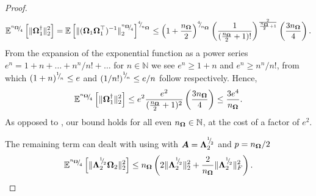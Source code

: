 \begin{proof}
    \begin{equation}
        \mathbb{E}^{\sfrac{n_{\mtx{\Omega}}}{4}}\left[ \lVert \mtx{\Omega}_1^{\dagger} \rVert _2^2 \right]
        = \mathbb{E}\left[ \lVert ( \mtx{\Omega}_1 \mtx{\Omega}_1^{\top} )^{-1} \rVert _2^{\sfrac{n_{\mtx{\Omega}}}{4}} \right]^{\sfrac{4}{n_{\mtx{\Omega}}}}%
        \leq \left( 1 + \frac{n_{\mtx{\Omega}}}{2} \right)^{\sfrac{4}{n_{\mtx{\Omega}}}} \left( \frac{1}{(\frac{n_{\mtx{\Omega}}}{2} + 1)!}\right)^{\frac{2}{\frac{n_{\mtx{\Omega}}}{2} + 1}} \left( \frac{3 n_{\mtx{\Omega}}}{4}\right).
    \end{equation}
    From the expansion of the exponential function as a power series $e^n = 1 + n + \dots + n^n/n! + \dots$ for $n \in \mathbb{N}$ we see $e^n \geq 1 + n$ and $e^n \geq n^n / n!$, from which $(1 + n)^{{}^{1}{\mskip -5mu/\mskip -3mu}_{n}} \leq e$ and $\left( 1/n! \right)^{{}^{1}{\mskip -5mu/\mskip -3mu}_{n}} \leq e/n$ follow respectively. Hence,
    \begin{equation}
        \mathbb{E}^{{}^{n_{\boldsymbol{\Omega}}}{\mskip -5mu/\mskip -3mu}_{4}}\left[ \lVert \boldsymbol{\Omega}_1^{\dagger} \rVert _2^2 \right]
        \leq e^2 \frac{e^2}{(\frac{n_{\boldsymbol{\Omega}}}{2}+ 1)^2} \left( \frac{3 n_{\boldsymbol{\Omega}}}{4}\right)
        \leq \frac{3 e^4}{n_{\boldsymbol{\Omega}}}.
        \label{equ:pinv-spectral-norm-bound}
    \end{equation}
    As opposed to \cite[Lemma B.3]{tropp-2023-randomized-algorithms}, our bound holds for all even $n_{\boldsymbol{\Omega}} \in \mathbb{N}$, at the cost of a factor of $e^2$.

    The remaining term can dealt with using  with $\boldsymbol{A} = \boldsymbol{\Lambda}_2^{{}^{1}{\mskip -5mu/\mskip -3mu}_{2}}$ and $p = n_{\boldsymbol{\Omega}}/2$
    \begin{equation}
        \mathbb{E}^{{}^{n_{\boldsymbol{\Omega}}}{\mskip -5mu/\mskip -3mu}_{4}}\left[ \lVert \boldsymbol{\Lambda}_2^{{}^{1}{\mskip -5mu/\mskip -3mu}_{2}} \boldsymbol{\Omega}_2 \rVert _2^2 \right]
        \leq n_{\boldsymbol{\Omega}} \left( 2 \lVert \boldsymbol{\Lambda}_2^{{}^{1}{\mskip -5mu/\mskip -3mu}_{2}} \rVert _2^2 + \frac{2}{n_{\boldsymbol{\Omega}}} \lVert \boldsymbol{\Lambda}_2^{{}^{1}{\mskip -5mu/\mskip -3mu}_{2}} \rVert _F^2 \right).
        \label{equ:spectral-norm-bound-applied}
    \end{equation}


\end{proof}
